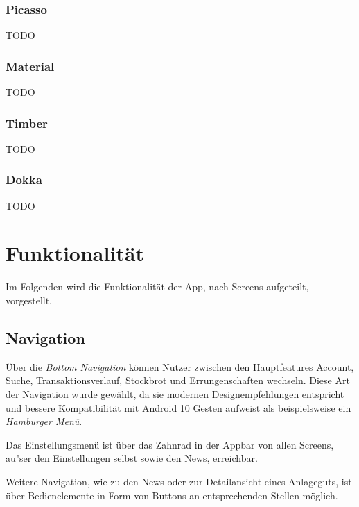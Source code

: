 \documentclass[a4paper]{article}
\begin{document}
\subsubsection{Picasso}
\label{subsubsec:technologies:bibs:picasso}
TODO


\subsubsection{Material}
\label{subsubsec:technologies:bibs:material}
TODO


\subsubsection{Timber}
\label{subsubsec:technologies:bibs:timber}
TODO


\subsubsection{Dokka}
\label{subsubsec:technologies:bibs:dokka}
TODO


\section{Funktionalität}
\label{sec:functionality}
Im Folgenden wird die Funktionalität der App, nach Screens aufgeteilt, vorgestellt.


\subsection{Navigation}
\label{subsec:functionality:navigation}
Über die \textit{Bottom Navigation} \autocite{bottom_navigation} können Nutzer zwischen den Hauptfeatures Account, Suche, Transaktionsverlauf, Stockbrot und Errungenschaften wechseln.
Diese Art der Navigation wurde gewählt, da sie modernen Designempfehlungen entspricht und bessere Kompatibilität mit Android 10 Gesten aufweist als beispielsweise ein \textit{Hamburger Menü}.

Das Einstellungsmenü ist über das Zahnrad in der Appbar von allen Screens, au"ser den Einstellungen selbst sowie den News, erreichbar.

Weitere Navigation, wie zu den News oder zur Detailansicht eines Anlageguts, ist über Bedienelemente in Form von Buttons an entsprechenden Stellen möglich.
\end{document}
